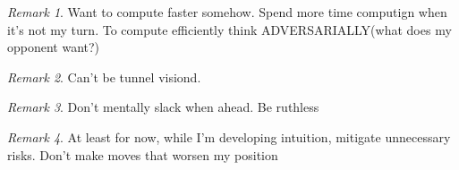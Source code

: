 \documentclass[11pt]{article}
\theoremstyle{remark}
\newtheorem{remark}{Remark}
\begin{document}
\begin{remark}
	Want to compute faster somehow. Spend more time computign when it's not my turn. To compute efficiently think ADVERSARIALLY(what does my opponent want?)
\end{remark}

\begin{remark}
	Can't be tunnel visiond.
\end{remark}

\begin{remark}
	Don't mentally slack when ahead. Be ruthless
\end{remark}

\begin{remark}
	At least for now, while I'm developing intuition, mitigate unnecessary risks. Don't make moves that worsen my position
\end{remark}
\end{document}
